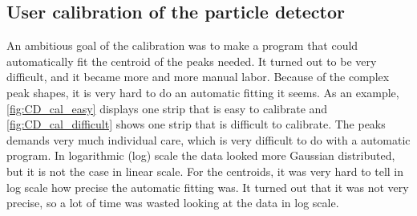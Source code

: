 \documentclass[twoside,english]{uiofysmaster/uiofysmaster}
\let\orgautoref\autoref
\renewcommand{\autoref}
        {%
		 \def\sectionautorefname{Section}%
		 \def\subsectionautorefname{Section}%
		 \def\subsubsectionautorefname{Section}%
		 \def\chapterautorefname{Chapter}%
          \orgautoref}
\begin{document}


\subsection{User calibration of the particle detector}\label{ssec:user_cal}
An ambitious goal of the calibration was to make a program that could automatically fit the centroid of the peaks needed. 
It turned out to be very difficult, and it became more and more manual labor. 
Because of the complex peak shapes, it is very hard to do an automatic fitting it seems. 
As an example, \autoref{fig:CD_cal_easy} displays one strip that is easy to calibrate and \autoref{fig:CD_cal_difficult} shows one strip that is difficult to calibrate.
The peaks demands very much individual care, which is very difficult to do with a automatic program. 
In logarithmic (log) scale the data looked more Gaussian distributed, but it is not the case in linear scale. 
For the centroids, it was very hard to tell in log scale how precise the automatic fitting was. 
It turned out that it was not very precise, so a lot of time was wasted looking at the data in log scale. 
\end{document}
